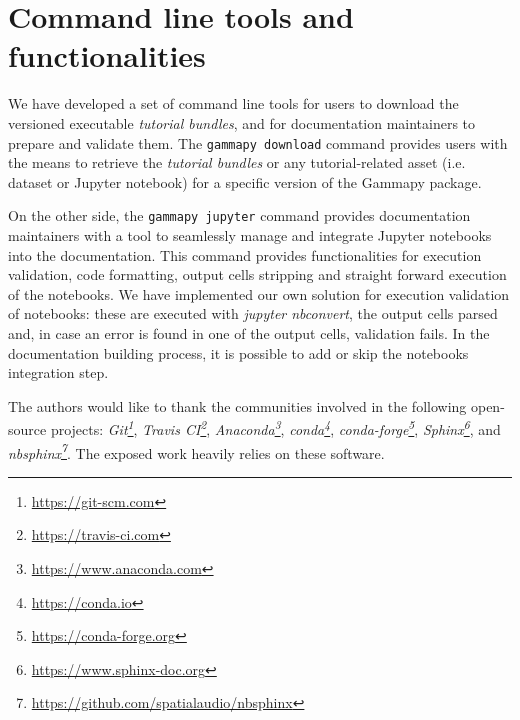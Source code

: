 \documentclass[11pt,twoside]{article}
\begin{document}
\section{Command line tools and functionalities}

We have developed a set of command line tools for users to download the versioned executable \textit{tutorial bundles}, and for documentation maintainers to prepare and validate them. The {\tt gammapy download} command provides users with the means to retrieve the \textit{tutorial bundles} or any tutorial-related asset (i.e. dataset or Jupyter notebook) for a specific version of the Gammapy package. 

On the other side, the {\tt gammapy jupyter} command  provides documentation maintainers with a tool to seamlessly manage and integrate Jupyter notebooks into the documentation. This command provides functionalities for execution validation, code formatting, output cells stripping and straight forward execution of the notebooks. We have implemented our own solution for execution validation of notebooks: these are executed with \textit{jupyter nbconvert}, the output cells parsed and, in case an error is found in one of the output cells, validation fails. In the documentation building process, it is possible to add or skip the notebooks integration step.


\acknowledgements The authors would like to thank the communities involved in the following open-source projects:  \textit{Git\footnote{\url{https://git-scm.com}}}, \textit{Travis CI\footnote{\url{https://travis-ci.com}}}, \textit{Anaconda\footnote{\url{https://www.anaconda.com}}}, \textit{conda\footnote{\url{https://conda.io}}}, \textit{conda-forge\footnote{\url{https://conda-forge.org}}}, \textit{Sphinx\footnote{\url{https://www.sphinx-doc.org}}}, and \textit{nbsphinx\footnote{\url{https://github.com/spatialaudio/nbsphinx}}}. The exposed work heavily relies on these software.


\end{document}
